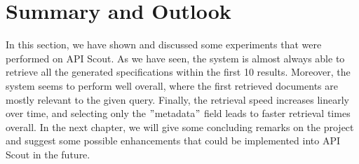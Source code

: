 \section{Summary and Outlook}\label{sec:summary-and-outlook-1}
In this section, we have shown and discussed some experiments that were performed on API Scout.
As we have seen, the system is almost always able to retrieve all the generated specifications within the first 10 results.
Moreover, the system seems to perform well overall, where the first retrieved documents are mostly relevant to the given query.
Finally, the retrieval speed increases linearly over time, and selecting only the \("\)metadata\("\) field leads to faster retrieval times overall.
In the next chapter, we will give some concluding remarks on the project and suggest some possible enhancements that could be implemented into API Scout in the future.
